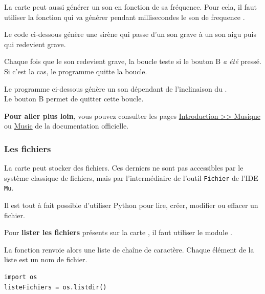 La carte \mb peut aussi générer un son en fonction de sa fréquence. Pour cela, il faut utiliser la fonction  qui va générer pendant  millisecondes le son de frequence .

\begin{methode}
    Le code ci-dessous génère une sirène qui passe d'un son grave à un son aigu puis qui redevient grave.\par
    Chaque fois que le son redevient grave, la boucle teste si le bouton B \emph{a été} pressé. Si c'est la cas, le programme quitte la boucle.
    
\end{methode}

\begin{methode}
    Le programme ci-dessous génère un son dépendant de l'inclinaison du \mb.\\
    Le bouton B permet de quitter cette boucle.
    
\end{methode}

\begin{remarque}
\textbf{Pour aller plus loin}, vous pouvez consulter les pages  \href{https://microbit-micropython.readthedocs.io/fr/latest/tutorials/music.html#}{Introduction >> Musique} ou \href{https://microbit-micropython.readthedocs.io/fr/latest/music.html#}{Music} de la documentation officielle.
\end{remarque}


\subsubsection{Les fichiers}

La carte \mb peut stocker des fichiers. Ces derniers ne sont pas accessibles par le système classique de fichiers, mais par l'intermédiaire de l'outil \texttt{Fichier} de l'IDE \texttt{Mu}.

Il est tout à fait possible d'utiliser Python pour lire, créer, modifier ou effacer un fichier.

\begin{methode}
    Pour \textbf{lister les fichiers} présents sur la carte \mb, il faut utiliser le module .\par
    La fonction  renvoie alors une liste de chaîne de caractère. Chaque élément de la liste est un nom de fichier.
\begin{verbatim}
import os
listeFichiers = os.listdir()
\end{verbatim}
\end{methode}

